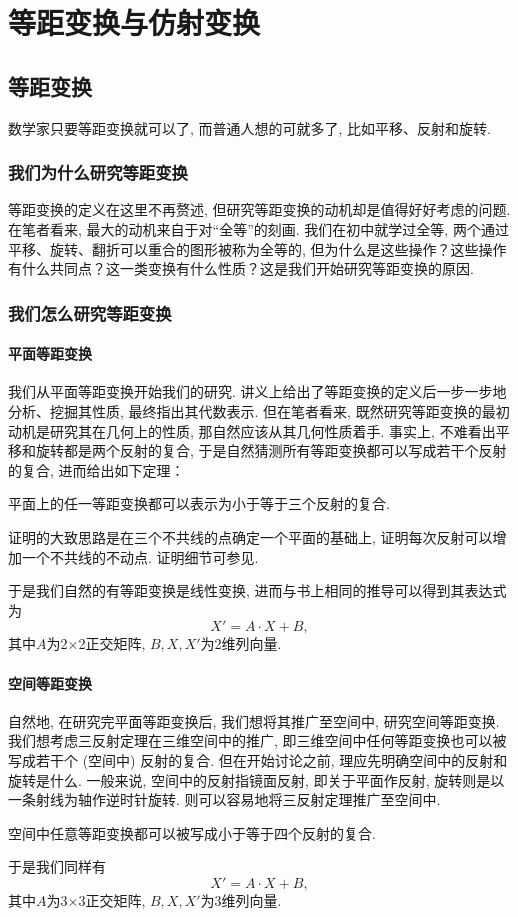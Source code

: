 \documentclass[./main.tex]{subfiles}
\begin{document}
\chapter{等距变换与仿射变换}
\section{等距变换}
数学家只要等距变换就可以了, 而普通人想的可就多了, 比如平移、反射和旋转. 
\subsection{我们为什么研究等距变换}
等距变换的定义在这里不再赘述, 但研究等距变换的动机却是值得好好考虑的问题. 在笔者看来, 最大的动机来自于对``全等''的刻画. 我们在初中就学过全等, 两个通过平移、旋转、翻折可以重合的图形被称为全等的, 但为什么是这些操作？这些操作有什么共同点？这一类变换有什么性质？这是我们开始研究等距变换的原因. 
\subsection{我们怎么研究等距变换}
\subsubsection{平面等距变换}
我们从平面等距变换开始我们的研究. 讲义上给出了等距变换的定义后一步一步地分析、挖掘其性质, 最终指出其代数表示. 但在笔者看来, 既然研究等距变换的最初动机是研究其在几何上的性质, 那自然应该从其几何性质着手. 事实上, 不难看出平移和旋转都是两个反射的复合, 于是自然猜测所有等距变换都可以写成若干个反射的复合, 进而给出如下定理：
\begin{theorem}[三反射定理]
    平面上的任一等距变换都可以表示为小于等于三个反射的复合. 
\end{theorem}
证明的大致思路是在三个不共线的点确定一个平面的基础上, 证明每次反射可以增加一个不共线的不动点. 证明细节可参见\cite{gos}.

于是我们自然的有等距变换是线性变换, 进而与书上相同的推导可以得到其表达式为
\[
X'=A\cdot X+B,
\]
其中$A$为2×2正交矩阵, $B,X,X'$为2维列向量. 
\subsubsection{空间等距变换}
自然地, 在研究完平面等距变换后, 我们想将其推广至空间中, 研究空间等距变换. 我们想考虑三反射定理在三维空间中的推广, 即三维空间中任何等距变换也可以被写成若干个 (空间中) 反射的复合. 但在开始讨论之前, 理应先明确空间中的反射和旋转是什么. 一般来说, 空间中的反射指镜面反射, 即关于平面作反射, 旋转则是以一条射线为轴作逆时针旋转. 则可以容易地将三反射定理推广至空间中. 
\begin{theorem}
    空间中任意等距变换都可以被写成小于等于四个反射的复合. 
\end{theorem}
于是我们同样有
\[
X'=A\cdot X+B,
\]
其中$A$为3×3正交矩阵, $B,X,X'$为3维列向量. 
\end{document}
